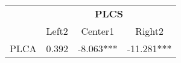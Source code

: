 \begin{table}[]
\begin{tabular}{cccc}
\hline
     & \multicolumn{3}{c}{\textbf{PLCS}} \\ \cline{2-4} 
     & Left2  & Center1    & Right2      \\
PLCA & 0.392  & -8.063***  & -11.281*** 
\end{tabular}
\end{table}